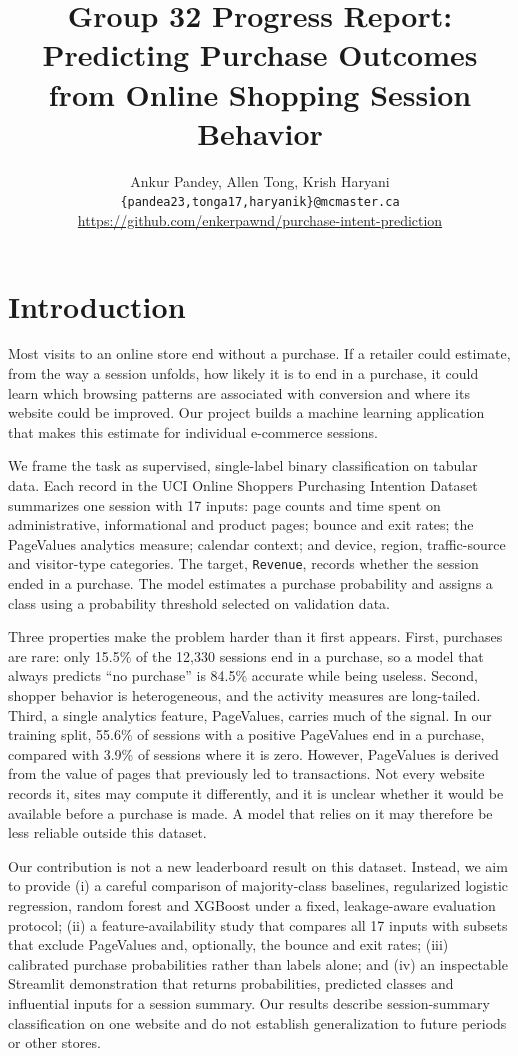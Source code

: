 \documentclass[11pt]{article}
\title{Group 32 Progress Report:\\Predicting Purchase Outcomes from Online Shopping Session Behavior}
\author{Ankur Pandey, Allen Tong, Krish Haryani \\
  \texttt{\{pandea23,tonga17,haryanik\}@mcmaster.ca} \\
  \url{https://github.com/enkerpawnd/purchase-intent-prediction}}
\begin{document}
\maketitle

\section{Introduction}

Most visits to an online store end without a purchase. If a retailer could
estimate, from the way a session unfolds, how likely it is to end in a
purchase, it could learn which browsing patterns are associated with
conversion and where its website could be improved. Our project builds a
machine learning application that makes this estimate for individual
e-commerce sessions.

We frame the task as supervised, single-label binary classification on
tabular data. Each record in the UCI Online Shoppers Purchasing Intention
Dataset \citep{sakar2018dataset} summarizes one session with 17 inputs: page
counts and time spent on administrative, informational and product pages;
bounce and exit rates; the PageValues analytics measure; calendar context; and
device, region, traffic-source and visitor-type categories. The target,
\texttt{Revenue}, records whether the session ended in a purchase. The model
estimates a purchase probability and assigns a class using a probability
threshold selected on validation data.

Three properties make the problem harder than it first appears. First,
purchases are rare: only 15.5\% of the 12,330 sessions end in a purchase, so a
model that always predicts ``no purchase'' is 84.5\% accurate while being
useless. Second, shopper behavior is heterogeneous, and the activity measures
are long-tailed. Third, a single analytics feature, PageValues, carries much
of the signal. In our training split, 55.6\% of sessions with a positive
PageValues end in a purchase, compared with 3.9\% of sessions where it is zero.
However, PageValues is derived from the value of pages that previously led to
transactions. Not every website records it, sites may compute it differently,
and it is unclear whether it would be available before a purchase is made. A
model that relies on it may therefore be less reliable outside this dataset.

Our contribution is not a new leaderboard result on this dataset. Instead, we
aim to provide (i) a careful comparison of majority-class baselines,
regularized logistic regression, random forest and XGBoost under a fixed,
leakage-aware evaluation protocol; (ii) a feature-availability study that
compares all 17 inputs with subsets that exclude PageValues and, optionally,
the bounce and exit rates; (iii) calibrated purchase probabilities rather than
labels alone; and (iv) an inspectable Streamlit demonstration that returns
probabilities, predicted classes and influential inputs for a session summary.
Our results describe session-summary classification on one website and do not
establish generalization to future periods or other stores.
\end{document}
